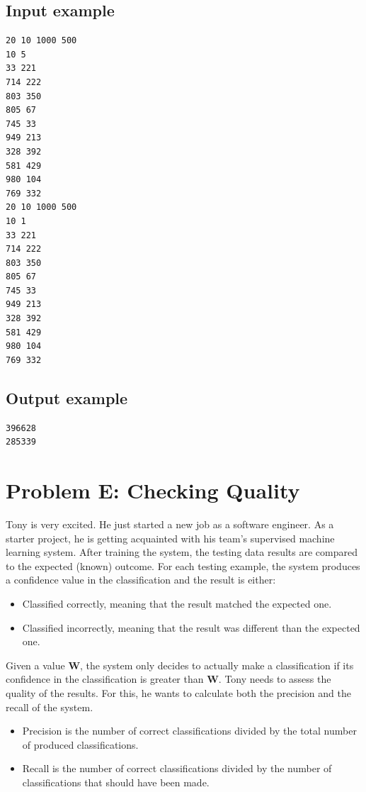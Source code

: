 \documentclass[11pt]{report}
\begin{document}
\subsection*{Input example}

\begin{verbatim}
20 10 1000 500
10 5
33 221
714 222
803 350
805 67
745 33
949 213
328 392
581 429
980 104
769 332
20 10 1000 500
10 1
33 221
714 222
803 350
805 67
745 33
949 213
328 392
581 429
980 104
769 332
\end{verbatim}

\subsection*{Output example}

\begin{verbatim}
396628
285339
\end{verbatim}

\clearpage

\section*{Problem E: Checking Quality}

Tony is very excited. He just started a new job as a software engineer. As a
starter project, he is getting acquainted with his team’s supervised machine
learning system. After training the system, the testing data results are
compared to the expected (known) outcome. For each testing example, the system
produces a confidence value in the classification and the result is either:

\begin{itemize}
\item Classified correctly, meaning that the result matched the expected one.
\item Classified incorrectly, meaning that the result was different than the expected one.
\end{itemize}

Given a value \textbf{W}, the system only decides to actually make a
classification if its confidence in the classification is greater than
\textbf{W}. Tony needs to assess the quality of the results. For this, he wants
to calculate both the precision and the recall of the system.

\begin{itemize}
\item Precision is the number of correct classifications divided by the total
  number of produced classifications.
\item Recall is the number of correct classifications divided by the number of classifications that should have been made.
\end{itemize}
\end{document}
